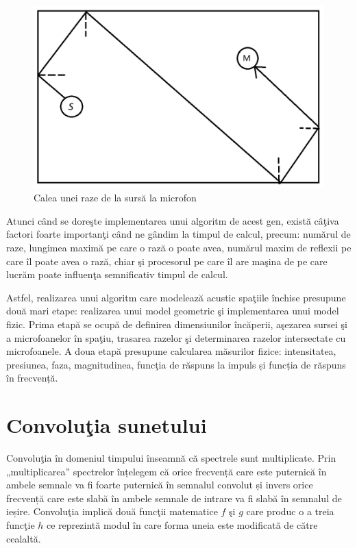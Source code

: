	
	\begin{figure}[!htb]
		\centering
		\includegraphics[width=1\linewidth]{imagini/reflectionExample.png}
		\caption{Calea unei raze de la surs\u{a} la microfon}
		\label{Fig11}
	\end{figure}
	
	Atunci c\^{a}nd se dore\c{s}te implementarea unui algoritm de acest gen, exist\u{a} c\^{a}\c{t}iva factori foarte importan\c{t}i c\^{a}nd ne g\^{a}ndim la timpul de calcul, precum: num\u{a}rul de raze, lungimea maxim\u{a} pe care o raz\u{a} o poate avea, num\u{a}rul maxim de reflexii pe care \^{i}l poate avea o raz\u{a}, chiar \c{s}i procesorul pe care \^{i}l are ma\c{s}ina de pe care lucr\u{a}m poate influen\c{t}a semnificativ timpul de calcul.
	 
	
	Astfel, realizarea unui algoritm care modeleaz\u{a} acustic spa\c{t}iile \^{i}nchise presupune dou\u{a} mari etape: realizarea unui model geometric \c{s}i implementarea unui model fizic. Prima etap\u{a} se ocup\u{a} de definirea dimensiunilor \^{i}nc\u{a}perii, a\c{s}ezarea sursei \c{s}i a microfoanelor \^{i}n spa\c{t}iu, trasarea razelor \c{s}i determinarea razelor intersectate cu microfoanele. A doua etap\u{a} presupune calcularea m\u{a}surilor fizice: intensitatea, presiunea, faza, magnitudinea, func\c{t}ia de r\u{a}spuns la impuls și funcția de răspuns în frecvență. 
	
	\section{Convolu\c{t}ia sunetului}
	
	Convolu\c{t}ia în domeniul timpului înseamnă că spectrele sunt multiplicate. Prin „multiplicarea” spectrelor înțelegem că orice frecvență care este puternică în ambele semnale va fi foarte puternică în semnalul convolut și invers orice frecvență care este slabă în ambele semnale de intrare va fi slabă în semnalul de ieșire. Convolu\c{t}ia implic\u{a} dou\u{a} func\c{t}ii matematice $f$ \c{s}i $g$ care produc o a treia func\c{t}ie $h$ ce reprezint\u{a} modul \^{i}n care forma uneia este modificat\u{a} de c\u{a}tre cealalt\u{a}.
	 
